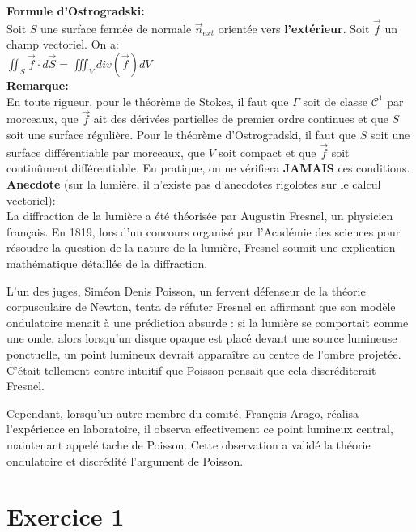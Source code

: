 \documentclass{article}
\begin{document}
\textbf{Formule d'Ostrogradski:} \\[0.2cm]

Soit $S$ une surface fermée de normale $\vec{n}_{ext}$ orientée vers \textbf{l'extérieur}. Soit $\vec{f}$ un champ vectoriel. On a: \\[0.15cm]
$\boxed{ \iint_S \vec{f} \cdot d\vec{S} = \iiint_V div(\vec{f}) dV}$\\[0.3cm]

\textbf{Remarque:} \\[0.2cm]

En toute rigueur, pour le théorème de Stokes, il faut que $\Gamma$ soit de classe $\mathcal{C}^1$ par morceaux, que $\vec{f}$ ait des dérivées partielles de premier ordre continues et que $S$ soit une surface régulière. 
Pour le théorème d'Ostrogradski, il faut que $S$ soit une surface différentiable par morceaux, que $V$ soit compact et que $\vec{f}$ soit continûment différentiable. 
En pratique, on ne vérifiera \textbf{JAMAIS} ces conditions. \\[0.5cm]



\textbf{Anecdote} (sur la lumière, il n'existe pas d'anecdotes rigolotes sur le calcul vectoriel):  \\[0.1cm]
La diffraction de la lumière a été théorisée par Augustin Fresnel, un physicien français. En 1819, lors d'un concours organisé par l'Académie des sciences pour résoudre la question de la nature de la lumière, Fresnel soumit une explication mathématique détaillée de la diffraction.

L'un des juges, Siméon Denis Poisson, un fervent défenseur de la théorie corpusculaire de Newton, tenta de réfuter Fresnel en affirmant que son modèle ondulatoire menait à une prédiction absurde : si la lumière se comportait comme une onde, alors lorsqu'un disque opaque est placé devant une source lumineuse ponctuelle, un point lumineux devrait apparaître au centre de l'ombre projetée. C'était tellement contre-intuitif que Poisson pensait que cela discréditerait Fresnel.

Cependant, lorsqu'un autre membre du comité, François Arago, réalisa l'expérience en laboratoire, il observa effectivement ce point lumineux central, maintenant appelé tache de Poisson. Cette observation a validé la théorie ondulatoire et discrédité l'argument de Poisson.


\section{Exercice 1}
\end{document}
